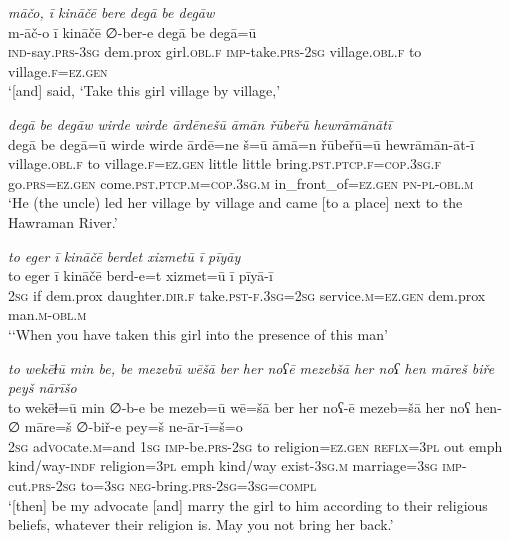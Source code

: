 \ea \label{ZP.39}
\textit{māčo, ī kināčē bere degā be degāw} \\ 
\gll m-āč-o ī kināčē ∅-ber-e degā be degā=ū \\ 
 \textsc{ind-}say\textsc{.prs}\textsc{-3sg} dem.prox girl\textsc{.obl}\textsc{.f} \textsc{imp-}take\textsc{.prs}-\textsc{2sg} village\textsc{.obl}\textsc{.f} to village\textsc{.f}\textsc{\textsc{=ez.gen}} \\ 
\glt `[and] said, ‘Take this girl village by village,'
\z 
 
\ea \label{ZP.41}
\textit{degā be degāw wirde wirde ārdēnešū āmān řūbeřū hewrāmānātī} \\ 
\gll degā be degā=ū wirde wirde ārdē=ne š=ū āmā=n řūbeřū=ū hewrāmān-āt-ī \\ 
 village\textsc{.obl}\textsc{.f} to village\textsc{.f}\textsc{\textsc{=ez.gen}} little little bring\textsc{.pst}\textsc{.ptcp}\textsc{.f}\textsc{=cop}\textsc{.3sg}\textsc{.f} go\textsc{.prs}\textsc{\textsc{=ez.gen}} come\textsc{.pst}\textsc{.ptcp}\textsc{.m}\textsc{=cop}\textsc{.3sg}\textsc{.m} in\_front\_of\textsc{\textsc{=ez.gen}} \textsc{pn}\textsc{\textsc{-pl}}\textsc{-obl}\textsc{.m} \\ 
\glt `He (the uncle) led her village by village and came [to a place] next to the Hawraman River.'
\z 
 
\ea \label{ZP.44}
\textit{to eger ī kināčē berdet xizmetū ī pīyāy} \\ 
\gll to eger ī kināčē berd-e=t xizmet=ū ī pīyā-ī \\ 
 \textsc{2sg} if dem.prox daughter\textsc{.dir}\textsc{.f} take\textsc{.pst}\textsc{-f}\textsc{.3sg}\textsc{=\textsc{2sg}} service\textsc{.m}\textsc{\textsc{=ez.gen}} dem.prox man\textsc{.m}\textsc{-obl}\textsc{.m} \\ 
\glt `‘When you have taken this girl into the presence of this man'
\z 
 
\ea \label{ZP.47}
\textit{to wekēɫū min be, be mezebū wēšā ber her noʕē mezebšā her noʕ hen māreš biře peyš nārīšo} \\ 
\gll to wekēɫ=ū min ∅-b-e be mezeb=ū wē=šā ber her noʕ-ē mezeb=šā her noʕ hen-∅ māre=š ∅-biř-e pey=š ne-ār-ī=š=o \\ 
 \textsc{2sg} ad\textsc{voc}ate\textsc{.m}=and \textsc{1sg} \textsc{imp-}be\textsc{.prs}-\textsc{2sg} to religion\textsc{\textsc{=ez.gen}} \textsc{reflx}\textsc{=3pl} out emph kind/way\textsc{-indf} religion\textsc{=3pl} emph kind/way exist\textsc{-3sg}\textsc{.m} marriage\textsc{=3sg} \textsc{imp-}cut\textsc{.prs}-\textsc{2sg} to\textsc{=3sg} \textsc{neg-}bring\textsc{.prs}\textsc{-2sg}\textsc{=3sg}\textsc{=compl} \\ 
\glt `[then] be my advocate [and] marry the girl to him according to their religious beliefs, whatever their religion is. May you not bring her back.'
\z 
 
